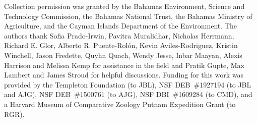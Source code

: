 Collection permission was granted by the Bahamas Environment, Science and Technology Commission, the Bahamas National Trust, the Bahamas Ministry of Agriculture, and the Cayman Islands Department of the Environment. The authors thank Sofia Prado-Irwin, Pavitra Muralidhar, Nicholas Herrmann, Richard E. Glor, Alberto R. Puente-Rol\'{o}n, Kevin Aviles-Rodriguez, Kristin Winchell, Jason Fredette, Quyhn Quach, Wendy Jesse, Inbar Maayan, Alexis Harrison and Melissa Kemp for assistance in the field and Pratik Gupte, Max Lambert and James Stroud for helpful discussions. Funding for this work was provided by the Templeton Foundation (to JBL), NSF DEB~\#1927194 (to JBL and AJG), NSF DEB~\#1500761 (to AJG), NSF DBI~\#1609284 (to CMD), and a Harvard Museum of Comparative Zoology Putnam Expedition Grant (to RGR).

